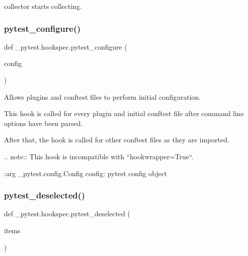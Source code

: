 \begin{DoxyVerb}collector starts collecting. \end{DoxyVerb}
 \mbox{\label{namespace__pytest_1_1hookspec_a9ff6a6659d0004d481dd0154b9fcaa55}} 
\subsubsection{\texorpdfstring{pytest\+\_\+configure()}{pytest\_configure()}}
{\footnotesize\ttfamily def \+\_\+pytest.\+hookspec.\+pytest\+\_\+configure (\begin{DoxyParamCaption}\item[{}]{config }\end{DoxyParamCaption})}

\begin{DoxyVerb}Allows plugins and conftest files to perform initial configuration.

This hook is called for every plugin and initial conftest file
after command line options have been parsed.

After that, the hook is called for other conftest files as they are
imported.

.. note::
    This hook is incompatible with ``hookwrapper=True``.

:arg _pytest.config.Config config: pytest config object
\end{DoxyVerb}
 \mbox{\label{namespace__pytest_1_1hookspec_a8f2b7b3881318461bd26ea869b4333a9}} 
\subsubsection{\texorpdfstring{pytest\+\_\+deselected()}{pytest\_deselected()}}
{\footnotesize\ttfamily def \+\_\+pytest.\+hookspec.\+pytest\+\_\+deselected (\begin{DoxyParamCaption}\item[{}]{items }\end{DoxyParamCaption})}

